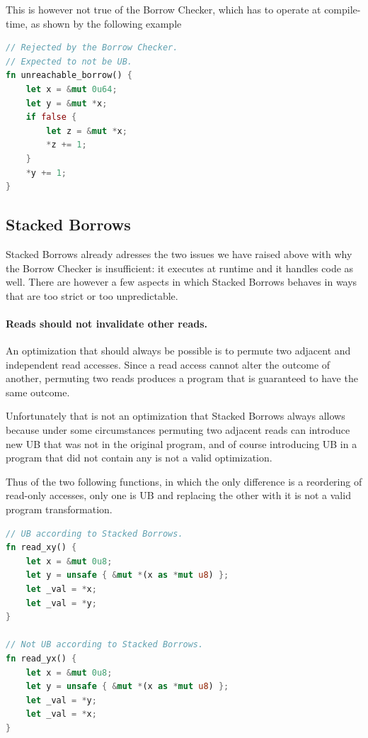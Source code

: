 \documentclass[a4paper,11pt]{article}
\theoremstyle{plain}
\theoremstyle{definition}
\theoremstyle{remark}
\newcommand{\tcode}[1]{\rstinline{#1}}
\begin{document}
This is however not true of the Borrow Checker, which has to operate at compile-time,
as shown by the following example
\begin{lstlisting}[language=rust]
// Rejected by the Borrow Checker.
// Expected to not be UB.
fn unreachable_borrow() {
    let x = &mut 0u64;
    let y = &mut *x;
    if false {
        let z = &mut *x;
        *z += 1;
    }
    *y += 1;
}
\end{lstlisting}

\subsection{Stacked Borrows}

Stacked Borrows already adresses the two issues we have raised above with
why the Borrow Checker is insufficient: it executes at runtime and it handles
\tcode{unsafe} code as well. There are however a few aspects in which
Stacked Borrows behaves in ways that are too strict or too unpredictable.

\paragraph*{Reads should not invalidate other reads.}
An optimization that should always be possible is to permute two adjacent and independent
read accesses. Since a read access cannot alter the outcome of another, permuting
two reads produces a program that is guaranteed to have the same outcome.

Unfortunately that is not an optimization that Stacked Borrows always allows
because under some circumstances permuting two adjacent reads can introduce new
UB that was not in the original program, and of course introducing UB in a program
that did not contain any is not a valid optimization.

Thus of the two following functions, in which the only difference is a reordering
of read-only accesses, only one is UB and replacing the other with it is not
a valid program transformation.
\begin{lstlisting}[language=rust]
// UB according to Stacked Borrows.
fn read_xy() {
    let x = &mut 0u8;
    let y = unsafe { &mut *(x as *mut u8) };
    let _val = *x;
    let _val = *y;
}

// Not UB according to Stacked Borrows.
fn read_yx() {
    let x = &mut 0u8;
    let y = unsafe { &mut *(x as *mut u8) };
    let _val = *y;
    let _val = *x;
}
\end{lstlisting}
\end{document}
